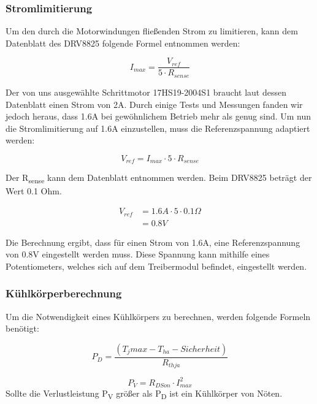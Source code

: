 \subsubsection{Stromlimitierung}
Um den durch die Motorwindungen fließenden Strom zu limitieren, kann dem Datenblatt des DRV8825 folgende Formel entnommen werden:

\begin{equation}
    I_{max} = \frac{V_{ref}} {5 \cdot R_{sense}}
\end{equation}

Der von uns ausgewählte Schrittmotor 17HS19-2004S1 braucht laut dessen Datenblatt einen Strom von 2A.
Durch einige Tests und Messungen fanden wir jedoch heraus, dass 1.6A bei gewöhnlichem Betrieb mehr als genug sind.
Um nun die Stromlimitierung auf 1.6A einzustellen, muss die Referenzspannung adaptiert werden:

\begin{equation*}
    V_{ref} = I_{max} \cdot 5 \cdot R_{sense}
\end{equation*}

Der R\textsubscript{sense} kann dem Datenblatt entnommen werden.
Beim DRV8825 beträgt der Wert 0.1 Ohm.

\begin{align*}
    V_{ref} &= 1.6A \cdot 5 \cdot 0.1\Omega \\
    &= 0.8V
\end{align*}

Die Berechnung ergibt, dass für einen Strom von 1.6A, eine Referenzspannung von 0.8V eingestellt werden muss.
Diese Spannung kann mithilfe eines Potentiometers, welches sich auf dem Treibermodul befindet, eingestellt werden.

\subsubsection{Kühlkörperberechnung}
Um die Notwendigkeit eines Kühlkörpers zu berechnen, werden folgende Formeln benötigt:

\begin{equation}
    P_D = \frac{(T_jmax - T_{ha} - Sicherheit)}{R_{thja}}
\end{equation}

\begin{equation}
    P_V = R_{DSon} \cdot I_{max}^2
\end{equation}
Sollte die Verlustleistung P\textsubscript{V} größer als P\textsubscript{D} ist ein Kühlkörper von Nöten. \\

